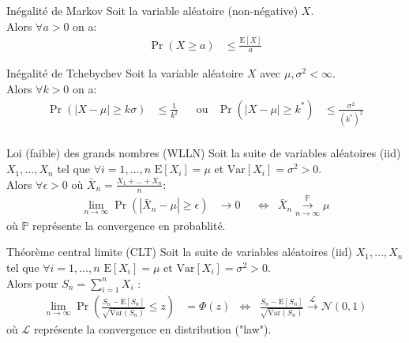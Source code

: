 \documentclass[10pt, french]{article}
\begin{document}
\begin{multicols*}{2}
\begin{algo}{Inégalité de Markov}
Soit la variable aléatoire (non-négative) $X$.\\
Alors $\forall a > 0$ on a:
\begin{align*}
	\Pr(X \ge a) 
	&\le 	\frac{\text{E}[X]}{a}
\end{align*}
\end{algo}

\begin{algo}{Inégalité de Tchebychev}
Soit la variable aléatoire $X$ avec $\mu, \sigma^{2} < \infty$.\\
Alors $\forall k > 0$ on a:
\begin{align*}
	\Pr\left( \left|X - \mu\right| \ge k \sigma\right)
	&\le 	\frac{1}{k^{2}}	&
	&\text{ou}	&
	\Pr\left( \left|X - \mu\right| \ge k^{*}\right)
	&\le 	\frac{\sigma^{2}}{(k^{*})^{2}}	\\
\end{align*}
\end{algo}

\begin{algo}{Loi (faible) des grands nombres (WLLN)}
Soit la suite de variables aléatoires (iid) $X_{1}, \dots, X_{n}$ tel que $\forall i = 1, \dots, n$ $\text{E}[X_{i}] = \mu$ et $\text{Var}[X_{i}] = \sigma^{2} > 0$.\\
Alors $\forall\epsilon > 0$ où $\bar{X}_{n} = \frac{X_{1} + \dots + X_{n}}{n}$:
\begin{align*} 
	\underset{n \rightarrow \infty}{\lim} \Pr\left( \left| \bar{X}_{n} -\mu \right| \ge \epsilon \right) 
	&\rightarrow		0	&
	&\Leftrightarrow	&
	\bar{X}_{n} \overset{\mathds{P}}{\underset{n \rightarrow \infty}{\longrightarrow}} \mu
\end{align*}
où $\mathds{P}$ représente la convergence en probablité.
\end{algo}

\begin{algo}{Théorème central limite (CLT)}
Soit la suite de variables aléatoires (iid) $X_{1}, \dots, X_{n}$ tel que $\forall i = 1, \dots, n$ $\text{E}[X_{i}] = \mu$ et $\text{Var}[X_{i}] = \sigma^{2} > 0$.\\
Alors pour $S_{n} = \sum_{i = 1}^{n} X_{i}$ :
\begin{align*} 
	\underset{n \rightarrow \infty}{\lim} \Pr\left( \frac{S_{n} - \text{E}[S_{n}]}{\sqrt{\text{Var}(S_{n})}} \le z \right) 
	&=	\Phi(z)
	&\Leftrightarrow	&
	\frac{S_{n} - \text{E}[S_{n}]}{\sqrt{\text{Var}(S_{n})}} \overset{\mathcal{L}}{\longrightarrow} \mathcal{N}(0, 1)
\end{align*}
où $\mathcal{L}$ représente la convergence en distribution ("law").
\end{algo}

\end{multicols*}
\end{document}
